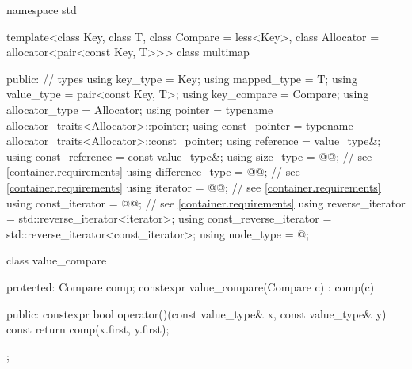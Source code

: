 %
%
\begin{codeblock}
namespace std {
  template<class Key, class T, class Compare = less<Key>,
           class Allocator = allocator<pair<const Key, T>>>
  class multimap {
  public:
    // types
    using key_type               = Key;
    using mapped_type            = T;
    using value_type             = pair<const Key, T>;
    using key_compare            = Compare;
    using allocator_type         = Allocator;
    using pointer                = typename allocator_traits<Allocator>::pointer;
    using const_pointer          = typename allocator_traits<Allocator>::const_pointer;
    using reference              = value_type&;
    using const_reference        = const value_type&;
    using size_type              = @@; // see \ref{container.requirements}
    using difference_type        = @@; // see \ref{container.requirements}
    using iterator               = @@; // see \ref{container.requirements}
    using const_iterator         = @@; // see \ref{container.requirements}
    using reverse_iterator       = std::reverse_iterator<iterator>;
    using const_reverse_iterator = std::reverse_iterator<const_iterator>;
    using node_type              = @\unspec@;

    class value_compare {
    protected:
      Compare comp;
      constexpr value_compare(Compare c) : comp(c) { }

    public:
      constexpr bool operator()(const value_type& x, const value_type& y) const {
        return comp(x.first, y.first);
      }
    };

}}
\end{codeblock}
